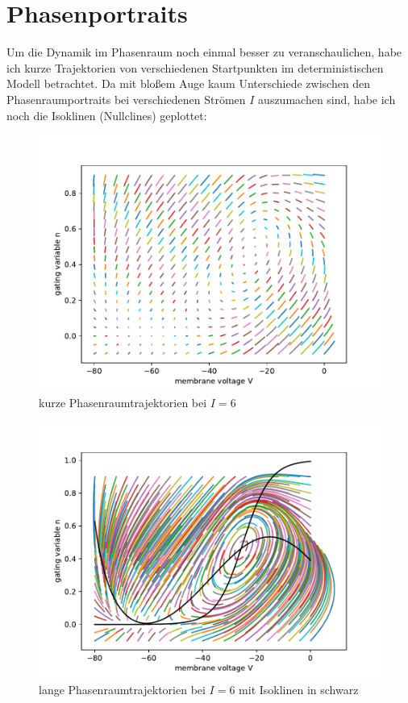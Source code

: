 \documentclass[12pt,a4paper]{article}
\begin{document}

\thispagestyle{empty}
\newpage
\tableofcontents
\thispagestyle{empty}
\newpage
{}
\section{Phasenportraits}
Um die Dynamik im Phasenraum noch einmal besser zu veranschaulichen, habe ich kurze Trajektorien von verschiedenen Startpunkten im deterministischen Modell betrachtet. Da mit bloßem Auge kaum Unterschiede zwischen den Phasenraumportraits bei verschiedenen Strömen $I$ auszumachen sind, habe ich noch die Isoklinen (Nullclines) geplottet: \begin{figure}[H]
	\centering
	\includegraphics[scale=0.9]{phaselinessh6.pdf} 
	\caption{kurze Phasenraumtrajektorien bei $I=6$}
	\label{prs}
\end{figure}  
\begin{figure}[H]
	\centering
	\includegraphics[scale=0.9]{phaseliness6wn.pdf} 
	\caption{lange Phasenraumtrajektorien bei $I=6$ mit Isoklinen in schwarz}
	\label{prll}
\end{figure} 
\end{document}
